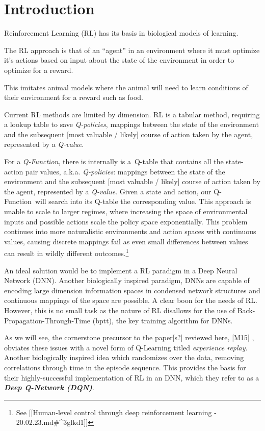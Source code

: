 \hypertarget{introduction}{%
\section{Introduction}\label{introduction}}

Reinforcement Learning (RL) has its basis in biological models of
learning.

The RL approach is that of an ``agent'' in an environment where it must
optimize it's actions based on input about the state of the environment
in order to optimize for a reward.

This imitates animal models where the animal will need to learn
conditions of their environment for a reward such as food.

Current RL methods are limited by dimension. RL is a tabular method,
requiring a lookup table to save \emph{Q-policies}, mappings between the
state of the environment and the subsequent {[}most valuable / likely{]}
course of action taken by the agent, represented by a \emph{Q-value}.

For a \emph{Q-Function}, there is internally is a~Q-table that contains
all the state-action pair values, a.k.a. \emph{Q-policies}: mappings
between the state of the environment and the subsequent {[}most valuable
/ likely{]} course of action taken by the agent, represented by a
\emph{Q-value}. Given a state and action, our Q-Function~will search
into its Q-table the corresponding value. This approach is unable to
scale to larger regimes, where increasing the space of environmental
inputs and possible actions scale the policy space exponentially. This
problem continues into more naturalistic environments and action spaces
with continuous values, causing discrete mappings fail as even small
differences between values can result in wildly different
outcomes.\footnote{See {[}{[}Human-level control through deep
  reinforcement learning - 20.02.23.md\#\^{}3glkd1{]}{]}}

An ideal solution would be to implement a RL paradigm in a Deep Neural
Network (DNN). Another biologically inspired paradigm, DNNs are capable
of encoding large dimension information spaces in condensed network
structures and continuous mappings of the space are possible. A clear
boon for the needs of RL. However, this is no small task as the nature
of RL disallows for the use of Back-Propagation-Through-Time (bptt), the
key training algorithm for DNNs.

As we will see, the cornerstone precursor to the paper{[}s?{]} reviewed
here, {[}M15{]} , obviates these issues with a novel form of Q-Learning
titled \emph{experience replay}. Another biologically inspired idea
which randomizes over the data, removing correlations through time in
the episode sequence. This provides the basis for their
highly-successful implementation of RL in an DNN, which they refer to as
a \textbf{\emph{Deep Q-Network (DQN)}}.

